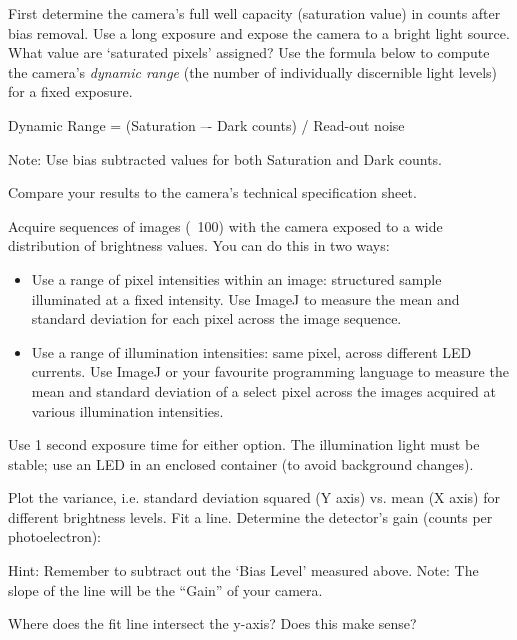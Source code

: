 \documentclass[a4paper]{report}
\newcommand{\nexercise}[0]{\arabic{exercises}\addtocounter{exercises}{1}}
\begin{document}
\begin{exercisebox}[frametitle={Exercise \nexercise: Compute the dynamic range of the camera}]
First determine the camera’s full well capacity (saturation value) in counts after bias removal. 
Use a long exposure and expose the camera to a bright light source. What value are ‘saturated pixels’ assigned? 
Use the formula below to compute the camera’s \textit{dynamic range} (the number of individually discernible light levels) for a fixed exposure. 
\begin{center}
Dynamic Range = (Saturation –- Dark counts) / Read-out noise
\end{center}

Note: Use bias subtracted values for both Saturation and Dark counts.

Compare your results to the camera’s technical specification sheet. 
\end{exercisebox}

\begin{exercisebox}[frametitle={Exercise \nexercise: Measure shot noise}]
Acquire sequences of images (~100) with the camera exposed to a wide distribution of brightness values. You can do this in two ways:
\begin{itemize}
	\item Use a range of pixel intensities within an image: structured sample illuminated at a fixed intensity. Use ImageJ to measure the mean and standard deviation for each pixel across the image sequence.
	\item Use a range of illumination intensities: same pixel, across different LED currents. Use ImageJ or your favourite programming language to measure the mean and standard deviation of a select pixel across the images acquired at various illumination intensities.
\end{itemize}
Use 1 second exposure time for either option. The illumination light must be stable; use an LED in an enclosed container (to avoid background changes). 

Plot the variance, i.e. standard deviation squared (Y axis) vs. mean (X axis) for different brightness levels. Fit a line. 
Determine the detector’s gain (counts per photoelectron): 

Hint: Remember to subtract out the ‘Bias Level’ measured above.
Note: The slope of the line will be the “Gain” of your camera.

Where does the fit line intersect the y-axis? Does this make sense? 
\end{exercisebox}
\end{document}
